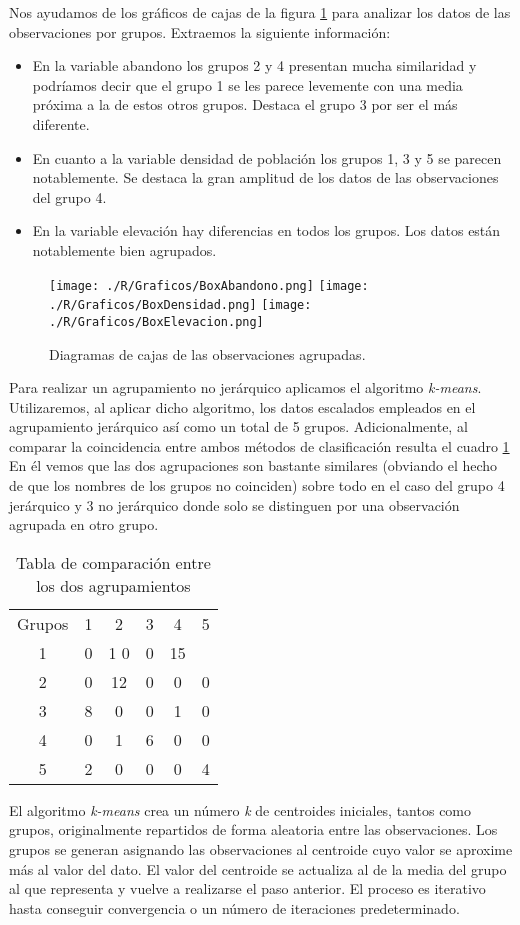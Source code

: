 \documentclass[11pt,a4paper]{article}
\begin{document}
Nos ayudamos de los gráficos de cajas de la figura \ref{fig:box} para analizar los datos de las observaciones por grupos. Extraemos la siguiente información:
\begin{itemize}
\item En la variable abandono los grupos 2 y 4 presentan mucha similaridad y podríamos decir que el grupo 1 se les parece levemente con una media próxima a la de estos otros grupos. Destaca el grupo 3 por ser el más diferente.
\item En cuanto a la variable densidad de población los grupos 1, 3 y 5 se parecen notablemente. Se destaca la gran amplitud de los datos de las observaciones del grupo 4.
\item En la variable elevación hay diferencias en todos los grupos. Los datos están notablemente bien agrupados.
\end{itemize}

\begin{figure}
\centering
\texttt{[image: ./R/Graficos/BoxAbandono.png]}
\texttt{[image: ./R/Graficos/BoxDensidad.png]}
\texttt{[image: ./R/Graficos/BoxElevacion.png]}
\caption{Diagramas de cajas de las observaciones agrupadas.}
\label{fig:box}
\end{figure}

Para realizar un agrupamiento no jerárquico aplicamos el algoritmo \textit{k-means}. Utilizaremos, al aplicar dicho algoritmo, los datos escalados empleados en el agrupamiento jerárquico así como un total de 5 grupos. Adicionalmente, al comparar la coincidencia entre ambos métodos de clasificación resulta el cuadro \ref{tab:comp} En él vemos que las dos agrupaciones son bastante similares (obviando el hecho de que los nombres de los grupos no coinciden) sobre todo en el caso del grupo 4 jerárquico y 3 no jerárquico donde solo se distinguen por una observación agrupada en otro grupo.

\begin{table}[ht]
\centering
\begin{tabular}{cccccc}
\toprule[0.4mm]
Grupos & 1 & 2 & 3 & 4 & 5\\
1 & 0 & 1 0 & 0 & 15\\
2 & 0 & 12 & 0 & 0 & 0\\
3 & 8 & 0 & 0 & 1 & 0\\
4 & 0 & 1 & 6 & 0 & 0\\
5 & 2 & 0 & 0 & 0 & 4\\
\bottomrule[0.4mm]
\end{tabular}
\caption{Tabla de comparación entre los dos agrupamientos}
\label{tab:comp}
\end{table}

El algoritmo \textit{k-means} crea un número \textit{k} de centroides iniciales, tantos como grupos, originalmente repartidos de forma aleatoria entre las observaciones. Los grupos se generan asignando las observaciones al centroide cuyo valor se aproxime más al valor del dato. El valor del centroide se actualiza al de la media del grupo al que representa y vuelve a realizarse el paso anterior. El proceso es iterativo hasta conseguir convergencia o un número de iteraciones predeterminado.
\end{document}
